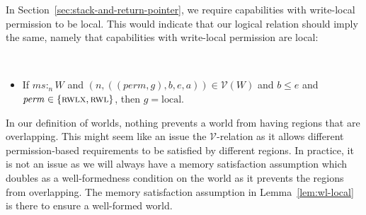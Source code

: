 \documentclass[format=acmsmall, review=true, screen=true]{acmart}
\renewcommand{\sectionname}{Section}
\newcommand{\var}[1]{\mathit{#1}}
\newcommand{\hs}{\var{ms}}
\newcommand{\ms}{\hs}
\newcommand{\gl}{\var{g}}
\newcommand{\addr}{\var{a}}
\newcommand{\start}{\var{b}}
\newcommand{\addrend}{\var{e}}
\newcommand{\heap}{\var{mem}}
\newcommand{\perm}{\var{perm}}
\newcommand{\stdcap}[1][(\perm,\gl)]{\left(#1,\start,\addrend,\addr \right)}
\newcommand{\heapSat}[3][\heap]{#1 :_{#2} #3}
\newcommand{\memSat}[3][n]{\heapSat[#2]{#1}{#3}}
\newcommand{\asmType}{\plaindom{AsmType}}
\newcommand{\plaindom}[1]{\mathrm{#1}}
\newcommand{\intr}[2]{\mathcal{#1}}
\newcommand{\valueintr}[1]{\intr{V}{#1}}
\newcommand{\stdvr}{\valueintr{\asmType}}
\newcommand{\npair}[2][n]{\left(#1,#2 \right)}
\newcommand{\plainperm}[1]{\textsc{#1}}
\newcommand{\readwritel}{\plainperm{rwl}}
\newcommand{\rwl}{\readwritel}
\newcommand{\rwlx}{\plainperm{rwlx}}
\newcommand{\plainlocality}[1]{\mathrm{#1}}
\newcommand{\local}{\plainlocality{local}}
\newenvironment{toplas}%
    {\color{OliveGreen}}{}
\begin{document}
\begin{toplas}
  In \sectionname~\ref{sec:stack-and-return-pointer}, we require capabilities with write-local permission to be local.
  This would indicate that our logical relation should imply the same, namely that capabilities with write-local permission are local:
  \begin{lemma}~
    \label{lem:wl-local}
    \begin{itemize}
    \item If $\memSat{\ms}{W}$ and $\npair{\stdcap} \in \stdvr(W)$ and $\start
      \leq \addrend$ and $\perm \in \{\rwlx,\rwl\}$, then $\gl = \local$.
    \end{itemize}
  \end{lemma}
  In our definition of worlds, nothing prevents a world from having regions that are overlapping.
  This might seem like an issue the $\stdvr$-relation as it allows different permission-based requirements to be satisfied by different regions.
  In practice, it is not an issue as we will always have a memory satisfaction assumption which doubles as a well-formedness condition on the world as it prevents the regions from overlapping.
  The memory satisfaction assumption in Lemma~\ref{lem:wl-local} is there to ensure a well-formed world.
\end{toplas}
\end{document}
